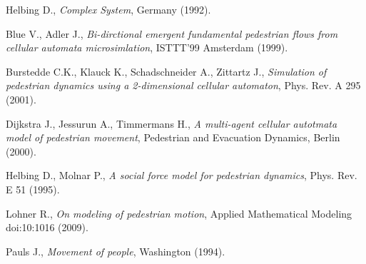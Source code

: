 \begin{thebibliography}{1}

Helbing D., \textsl{Complex System}, Germany (1992).

Blue V., Adler J.,  \textsl{Bi-dirctional emergent fundamental pedestrian flows from cellular automata microsimlation}, ISTTT'99 Amsterdam (1999).

Burstedde C.K., Klauck K., Schadschneider A., Zittartz J., \textsl{Simulation of pedestrian dynamics using a 2-dimensional cellular automaton}, Phys. Rev. A 295 (2001).

Dijkstra J., Jessurun A., Timmermans H., \textsl{A multi-agent cellular autotmata model of pedestrian movement}, Pedestrian and Evacuation Dynamics, Berlin (2000).

Helbing D., Molnar P., \textsl{A social force model for pedestrian dynamics}, Phys. Rev. E 51 (1995).

Lohner R., \textsl{On modeling of pedestrian motion}, Applied Mathematical Modeling doi:10:1016 (2009).

Pauls J., \textsl{Movement of people}, Washington (1994).

\end{thebibliography}
